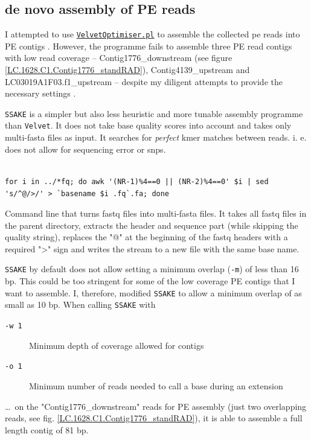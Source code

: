 \documentclass[a4paper,12pt,times,print,index, custombib]{PhDThesisPSnPDF}\usepackage[]{graphicx}\usepackage[]{color}
\begin{document}
\FloatBarrier
\subsection{de novo assembly of PE reads}\label{ch:PE_read_assembly}

I attempted to use \href{http://www.vicbioinformatics.com/software.velvetoptimiser.shtml}{\texttt{VelvetOptimiser.pl}} to assemble the collected \gls{pe} reads into PE contigs \citep{Zerbino2008}. However, the programme fails to assemble three PE read contigs with low read coverage -- Contig1776\_downstream (see figure  \ref{LC.1628.C1.Contig1776_standRAD}), Contig4139\_upstream and LC03019A1F03.f1\_upstream -- despite my diligent attempts to provide the necessary settings \citep{Zerbino2010}.

\texttt{SSAKE} \citep{Warren2007} is a simpler but also less heuristic and more tunable assembly programme than \texttt{Velvet}. It does not take base quality scores into account and takes only multi-fasta files as input. It searches for \emph{perfect} \gls{kmer} matches between reads. i. e. does not allow for sequencing error or \glspl{snp}.

\begin{cmd}
\captionsetup{type=cmd} %
\begin{Verbatim}[fontsize=\scriptsize, formatcom=\color{darkgray}]

for i in ../*fq; do awk '(NR-1)%4==0 || (NR-2)%4==0' $i | sed 's/^@/>/' > `basename $i .fq`.fa; done
\end{Verbatim}
\caption[ fastq files into multi-fasta files]{Command line that turns fastq files into multi-fasta files. It takes all fastq files in the parent directory, extracts the header and sequence part (while skipping the quality string), replaces the "@" at the beginning of the fastq headers with a required ">" sign and writes the stream to a new file with the same base name.}
\label{fastq_to_fasta}
\end{cmd}

\texttt{SSAKE} by default does not allow setting a minimum overlap (\texttt{-m}) of less than 16 \gls{bp}. This could be too stringent for some of the low coverage PE contigs that I want to assemble. I, therefore, modified \texttt{SSAKE} to allow a minimum overlap of as small as 10 bp. When calling \texttt{SSAKE} with 
\begin{description}
\item[\texttt{-w 1}] Minimum depth of coverage allowed for contigs
\item[\texttt{-o 1}] Minimum number of reads needed to call a base during an extension
\end{description}
\dots ~on the "Contig1776\_downstream" reads for PE assembly (just two overlapping reads, see fig. \ref{LC.1628.C1.Contig1776_standRAD}), it is able to assemble a full length contig of 81 bp.
\end{document}
